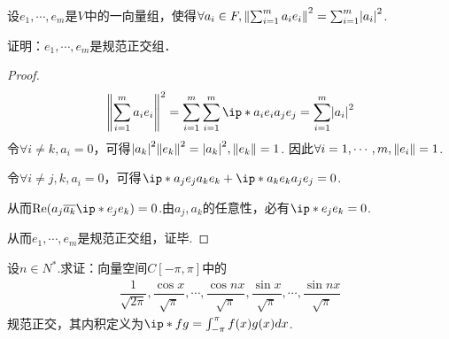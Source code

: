 \newpage

\begin{problem}[1]\label{6.B.1}
    设\(e_1,\cdots,e_m\)是\(V\)中的一向量组，使得\(\forall a_i \in F,\norm*{\sum_{i=1}^m a_ie_i}^2=\sum_{i=1}^m \abs*{a_i}^2\).

    证明：\(e_1,\cdots,e_m\)是规范正交组．
\end{problem}

\begin{proof}
    \begin{align*}
        \norm*{\sum_{i=1}^m a_ie_i}^2=\sum_{i=1}^m \sum_{i=1}^m \ip*{a_ie_i}{a_je_j}=\sum_{i=1}^m \abs*{a_i}^2
    \end{align*}
    令\(\forall i \ne k,a_i=0\)，可得\(\abs*{a_{k}}^2\norm*{e_{k}}^2=\abs*{a_{k}}^2,\norm*{e_{k}}=1\).
    因此\(\forall i=1,\cdots,m,\norm*{e_i}=1\).

    令\(\forall i \ne j,k,a_i=0\)，可得\(\ip*{a_je_j}{a_ke_k}+\ip*{a_ke_k}{a_je_j}=0\).

    从而\(\mathrm{Re}(a_j\ol{a_k}\ip*{e_j}{e_k})=0\).由\(a_j,a_k\)的任意性，必有\(\ip*{e_j}{e_k}=0\).

    从而\(e_1,\cdots,e_m\)是规范正交组，证毕.
\end{proof}

\begin{problem}[4]\label{6.B.4}
    设\(n \in N^*\).求证：向量空间\(C[-\pi,\pi]\)中的
    \begin{align*}
        \dfrac{1}{\sqrt{2\pi}},\dfrac{\cos x}{\sqrt{\pi}},\cdots,\dfrac{\cos nx}{\sqrt{\pi}},
        \dfrac{\sin x}{\sqrt{\pi}},\cdots,\dfrac{\sin nx}{\sqrt{\pi}}
    \end{align*}
    规范正交，其内积定义为\(\ip*{f}{g}=\int_{-\pi}^{\pi}f(x)g(x)dx\).
\end{problem}

